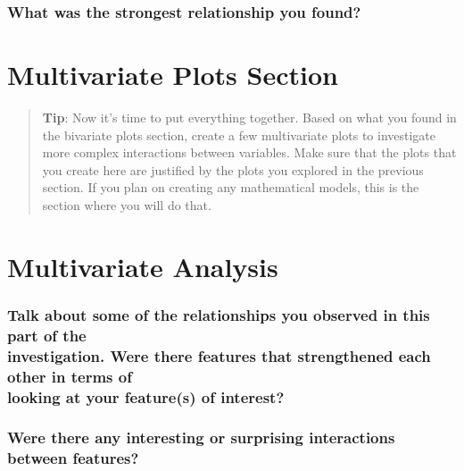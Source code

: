 \documentclass[]{article}
\begin{document}
\subsubsection{What was the strongest relationship you
found?}\label{what-was-the-strongest-relationship-you-found}

\section{Multivariate Plots Section}\label{multivariate-plots-section}

\begin{quote}
\textbf{Tip}: Now it's time to put everything together. Based on what
you found in the bivariate plots section, create a few multivariate
plots to investigate more complex interactions between variables. Make
sure that the plots that you create here are justified by the plots you
explored in the previous section. If you plan on creating any
mathematical models, this is the section where you will do that.
\end{quote}

\section{Multivariate Analysis}\label{multivariate-analysis}

\subsubsection{\texorpdfstring{Talk about some of the relationships you
observed in this part of the\\
investigation. Were there features that strengthened each other in terms
of\\
looking at your feature(s) of
interest?}{Talk about some of the relationships you observed in this part of the investigation. Were there features that strengthened each other in terms of looking at your feature(s) of interest?}}\label{talk-about-some-of-the-relationships-you-observed-in-this-part-of-the-investigation.-were-there-features-that-strengthened-each-other-in-terms-of-looking-at-your-features-of-interest}

\subsubsection{Were there any interesting or surprising interactions
between
features?}\label{were-there-any-interesting-or-surprising-interactions-between-features}
\end{document}
